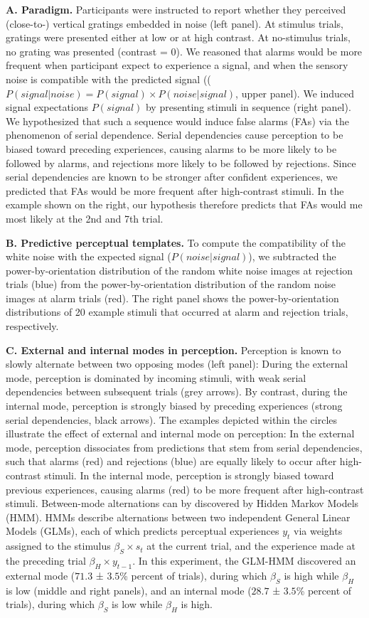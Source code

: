 \documentclass[
]{article}
\begin{document}
\textbf{A. Paradigm.} Participants were instructed to report whether
they perceived (close-to-) vertical gratings embedded in noise (left
panel). At stimulus trials, gratings were presented either at low or at
high contrast. At no-stimulus trials, no grating was presented (contrast
= 0). We reasoned that alarms would be more frequent when participant
expect to experience a signal, and when the sensory noise is compatible
with the predicted signal
((\(P(signal|noise) = P(signal) \times P(noise|signal)\), upper panel).
We induced signal expectations \(P(signal)\) by presenting stimuli in
sequence (right panel). We hypothesized that such a sequence would
induce false alarms (FAs) via the phenomenon of serial dependence.
Serial dependencies cause perception to be biased toward preceding
experiences, causing alarms to be more likely to be followed by alarms,
and rejections more likely to be followed by rejections. Since serial
dependencies are known to be stronger after confident experiences, we
predicted that FAs would be more frequent after high-contrast stimuli.
In the example shown on the right, our hypothesis therefore predicts
that FAs would me most likely at the 2nd and 7th trial.

\textbf{B. Predictive perceptual templates.} To compute the
compatibility of the white noise with the expected signal
(\(P(noise|signal)\)), we subtracted the power-by-orientation
distribution of the random white noise images at rejection trials (blue)
from the power-by-orientation distribution of the random noise images at
alarm trials (red). The right panel shows the power-by-orientation
distributions of 20 example stimuli that occurred at alarm and rejection
trials, respectively.

\textbf{C. External and internal modes in perception.} Perception is
known to slowly alternate between two opposing modes (left panel):
During the external mode, perception is dominated by incoming stimuli,
with weak serial dependencies between subsequent trials (grey arrows).
By contrast, during the internal mode, perception is strongly biased by
preceding experiences (strong serial dependencies, black arrows). The
examples depicted within the circles illustrate the effect of external
and internal mode on perception: In the external mode, perception
dissociates from predictions that stem from serial dependencies, such
that alarms (red) and rejections (blue) are equally likely to occur
after high-contrast stimuli. In the internal mode, perception is
strongly biased toward previous experiences, causing alarms (red) to be
more frequent after high-contrast stimuli. Between-mode alternations can
by discovered by Hidden Markov Models (HMM). HMMs describe alternations
between two independent General Linear Models (GLMs), each of which
predicts perceptual experiences \(y_t\) via weights assigned to the
stimulus \(\beta_S \times s_t\) at the current trial, and the experience
made at the preceding trial \(\beta_H \times y_{t-1}\). In this
experiment, the GLM-HMM discovered an external mode (\(71.3\) ±
\(3.5\)\% percent of trials), during which \(\beta_S\) is high while
\(\beta_H\) is low (middle and right panels), and an internal mode
(\(28.7\) ± \(3.5\)\% percent of trials), during which \(\beta_S\) is
low while \(\beta_H\) is high.
\end{document}
